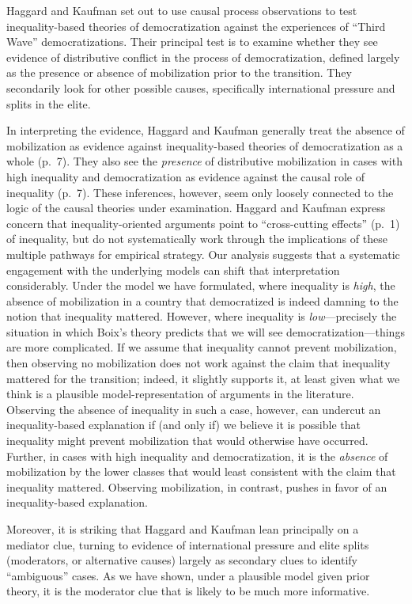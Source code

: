 \documentclass[
  12pt,
]{book}
\begin{document}
Haggard and Kaufman set out to use causal process observations to test inequality-based theories of democratization against the experiences of ``Third Wave'' democratizations. Their principal test is to examine whether they see evidence of distributive conflict in the process of democratization, defined largely as the presence or absence of mobilization prior to the transition. They secondarily look for other possible causes, specifically international pressure and splits in the elite.

In interpreting the evidence, Haggard and Kaufman generally treat the absence of mobilization as evidence against inequality-based theories of democratization as a whole (p.~7). They also see the \emph{presence} of distributive mobilization in cases with high inequality and democratization as evidence against the causal role of inequality (p.~7). These inferences, however, seem only loosely connected to the logic of the causal theories under examination. Haggard and Kaufman express concern that inequality-oriented arguments point to ``cross-cutting effects'' (p.~1) of inequality, but do not systematically work through the implications of these multiple pathways for empirical strategy. Our analysis suggests that a systematic engagement with the underlying models can shift that interpretation considerably. Under the model we have formulated, where inequality is \emph{high}, the absence of mobilization in a country that democratized is indeed damning to the notion that inequality mattered. However, where inequality is \emph{low}---precisely the situation in which Boix's theory predicts that we will see democratization---things are more complicated. If we assume that inequality cannot prevent mobilization, then observing no mobilization does not work against the claim that inequality mattered for the transition; indeed, it slightly supports it, at least given what we think is a plausible model-representation of arguments in the literature. Observing the absence of inequality in such a case, however, can undercut an inequality-based explanation if (and only if) we believe it is possible that inequality might prevent mobilization that would otherwise have occurred. Further, in cases with high inequality and democratization, it is the \emph{absence} of mobilization by the lower classes that would least consistent with the claim that inequality mattered. Observing mobilization, in contrast, pushes in favor of an inequality-based explanation.

Moreover, it is striking that Haggard and Kaufman lean principally on a mediator clue, turning to evidence of international pressure and elite splits (moderators, or alternative causes) largely as secondary clues to identify ``ambiguous'' cases. As we have shown, under a plausible model given prior theory, it is the moderator clue that is likely to be much more informative.
\end{document}
